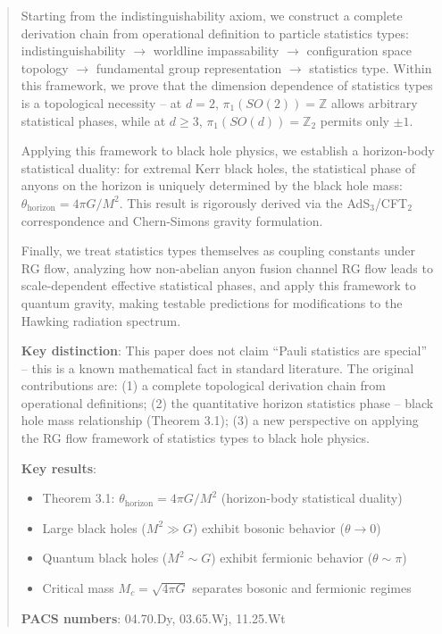 \documentclass[11pt,a4paper]{article}
\begin{document}
\begin{abstract}
Starting from the indistinguishability axiom, we construct a complete derivation chain from operational definition to particle statistics types:
indistinguishability $\rightarrow$ worldline impassability $\rightarrow$ configuration space topology $\rightarrow$ fundamental group representation $\rightarrow$ statistics type.
Within this framework, we prove that the dimension dependence of statistics types is a topological necessity --
at $d=2$, $\pi_1(SO(2))=\mathbb{Z}$ allows arbitrary statistical phases,
while at $d\geq 3$, $\pi_1(SO(d))=\mathbb{Z}_2$ permits only $\pm 1$.

Applying this framework to black hole physics, we establish a horizon-body statistical duality:
for extremal Kerr black holes, the statistical phase of anyons on the horizon is uniquely determined by the black hole mass:
$\theta_{\text{horizon}} = 4\pi G/M^2$.
This result is rigorously derived via the AdS$_3$/CFT$_2$ correspondence and Chern-Simons gravity formulation.

Finally, we treat statistics types themselves as coupling constants under RG flow, analyzing how non-abelian anyon fusion channel
RG flow leads to scale-dependent effective statistical phases, and apply this framework to quantum gravity,
making testable predictions for modifications to the Hawking radiation spectrum.

\textbf{Key distinction}: This paper does not claim ``Pauli statistics are special'' -- this is a known mathematical fact in standard literature.
The original contributions are: (1) a complete topological derivation chain from operational definitions;
(2) the quantitative horizon statistics phase -- black hole mass relationship (Theorem 3.1);
(3) a new perspective on applying the RG flow framework of statistics types to black hole physics.

\textbf{Key results}:
\begin{itemize}
\item Theorem 3.1: $\theta_{\text{horizon}} = 4\pi G/M^2$ (horizon-body statistical duality)
\item Large black holes ($M^2 \gg G$) exhibit bosonic behavior ($\theta \to 0$)
\item Quantum black holes ($M^2 \sim G$) exhibit fermionic behavior ($\theta \sim \pi$)
\item Critical mass $M_c = \sqrt{4\pi G}$ separates bosonic and fermionic regimes
\end{itemize}

\textbf{PACS numbers}: 04.70.Dy, 03.65.Wj, 11.25.Wt
\end{abstract}
\end{document}
